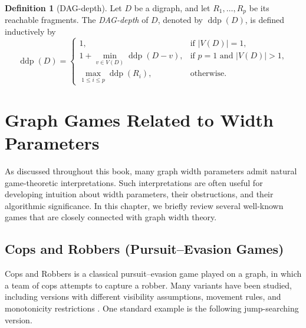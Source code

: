 \documentclass[10pt]{book}
\theoremstyle{definition}
\newtheorem{definition}[theorem]{Definition}
\begin{document}
\begin{definition}[DAG-depth]
\cite{388,Ganian2014DigraphWM}
Let \(D\) be a digraph, and let \(R_1,\dots,R_p\) be its reachable fragments.  
The \emph{DAG-depth} of \(D\), denoted by \(\operatorname{ddp}(D)\), is defined inductively by
\[
\operatorname{ddp}(D)=
\begin{cases}
1, & \text{if } |V(D)|=1,\\[4pt]
1+\displaystyle\min_{v\in V(D)} \operatorname{ddp}(D-v),
& \text{if } p=1 \text{ and } |V(D)|>1,\\[8pt]
\displaystyle\max_{1\le i\le p}\operatorname{ddp}(R_i),
& \text{otherwise}.
\end{cases}
\]
\end{definition}


\newpage
\chapter{Graph Games Related to Width Parameters}

As discussed throughout this book, many graph width parameters admit natural game-theoretic interpretations.  
Such interpretations are often useful for developing intuition about width parameters, their obstructions, and their algorithmic significance.  
In this chapter, we briefly review several well-known games that are closely connected with graph width theory.

\section{Cops and Robbers (Pursuit--Evasion Games)}

Cops and Robbers is a classical pursuit--evasion game played on a graph, in which a team of cops attempts to capture a robber.  
Many variants have been studied, including versions with different visibility assumptions, movement rules, and monotonicity restrictions \cite{16,kosowski2015k,christophe2019connected}.  
One standard example is the following jump-searching version.
\end{document}
